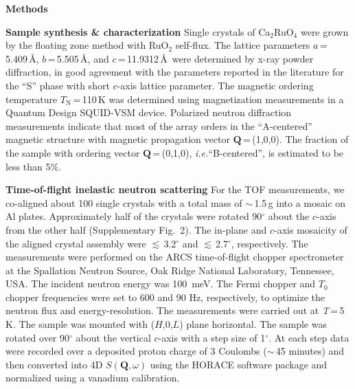 \documentclass[twocolumn,prb,aps,showpacs]{revtex4-1}
\newcommand{\CRO}{{Ca$_2$RuO$_4$} }
\begin{document}
\vspace{20 pt}
\noindent
{\bf Methods}

\vspace{10 pt}
\noindent
{\bf Sample synthesis \& characterization}
Single crystals of \CRO were grown by the floating zone method with RuO$_{2}$ self-flux\cite{Nakatsuji2001}. The lattice parameters $a$\,=\,5.409\,\AA, $b$\,=\,5.505\,\AA, and $c$\,=\,11.9312\,\AA\,  were determined by x-ray powder diffraction, in good agreement with the parameters reported in the literature\cite{Braden_1998} for the ``S'' phase with short $c$-axis lattice parameter. The magnetic ordering temperature $T_\mathrm{N}$\,=\,110\,K was determined using magnetization measurements in a Quantum Design SQUID-VSM device. Polarized neutron diffraction measurements indicate that most of the array orders in the ``A-centered'' magnetic structure with magnetic propagation vector $\mathbf{Q}$\,=\,(1,0,0)\cite{Braden_1998}. The fraction of the sample with ordering vector $\mathbf{Q}$\,=\,(0,1,0), \textit{i.e.}``B-centered'', is estimated to be less than 5\%.

\vspace{10 pt}
\noindent
{\bf Time-of-flight inelastic neutron scattering}
For the TOF measurements, we co-aligned about 100 single crystals with a total mass of $\sim$\,1.5\,g into a mosaic on Al plates. Approximately half of the crystals were rotated 90$^\circ$ about the $c$-axis from the other half (Supplementary Fig.~2). The in-plane and $c$-axis mosaicity of the aligned crystal assembly were  $\lesssim$\,3.2$^\circ$ and  $\lesssim$\,2.7$^\circ$, respectively. The measurements were performed on the ARCS time-of-flight chopper spectrometer at the Spallation Neutron Source, Oak Ridge National Laboratory, Tennessee, USA. The incident neutron energy was 100~meV. The Fermi chopper and  $T_{0}$ chopper frequencies were set to 600 and 90 Hz, respectively, to optimize the neutron flux and energy-resolution. The measurements were carried out at {\it T}\,=\,5\,K. The sample was mounted with ($H$,0,$L$) plane horizontal. The sample was rotated over 90$^\circ$  about the vertical $c$-axis with a step size of 1$^\circ$. At each step data were recorded over a deposited proton charge of 3 Coulombs ($\sim$\,45 minutes) and then converted into 4D $S(\mathbf {Q},\omega)$ using the HORACE software package\cite{Horace} and normalized using a vanadium calibration.
\end{document}
